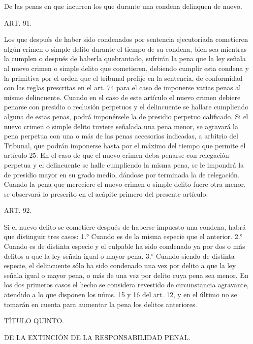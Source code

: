 De las penas en que incurren los que durante una condena delinquen de nuevo.


    ART. 91.

    Los que después de haber sido condenados por sentencia ejecutoriada cometieren algún crimen o simple delito durante el tiempo de su condena, bien sea mientras la cumplen o después de haberla quebrantado, sufrirán la pena que la ley señala al nuevo crimen o simple delito que cometieren, debiendo cumplir esta condena y la primitiva por el orden que el tribunal prefije en la sentencia, de conformidad con las reglas prescritas en el art. 74 para el caso de imponerse varias penas al mismo delincuente. 
    Cuando en el caso de este artículo el nuevo crimen debiere penarse con presidio o reclusión perpetuos y el delincuente se hallare cumpliendo alguna de estas penas, podrá imponérsele la de presidio perpetuo calificado. Si el nuevo crimen o simple delito tuviere señalada una pena menor, se agravará la pena perpetua con una o más de las penas accesorias indicadas, a arbitrio del Tribunal, que podrán imponerse hasta por el máximo del tiempo que permite el artículo 25.
    En el caso de que el nuevo crimen deba penarse con relegación perpetua y el delincuente se halle cumpliendo la misma pena, se le impondrá la de presidio mayor en su grado medio, dándose por terminada la de relegación.
    Cuando la pena que mereciere el nuevo crimen o simple delito fuere otra menor, se observará lo prescrito en el acápite primero del presente artículo.

    ART. 92.

    Si el nuevo delito se cometiere después de haberse impuesto una condena, habrá que distinguir tres casos:
    1.° Cuando es de la misma especie que el anterior.
    2.° Cuando es de distinta especie y el culpable ha sido condenado ya por dos o más delitos a que la ley señala igual o mayor pena.
    3.° Cuando siendo de distinta especie, el delincuente sólo ha sido condenado una vez por delito a que la ley señala igual o mayor pena, o más de una vez por delito cuya pena sea menor.
    En los dos primeros casos el hecho se considera revestido de circunstancia agravante, atendido a lo que disponen los núms. 15 y 16 del art. 12, y en el último no se tomarán en cuenta para aumentar la pena los delitos anteriores.





    TÍTULO QUINTO.

    DE LA EXTINCIÓN DE LA RESPONSABILIDAD PENAL.


